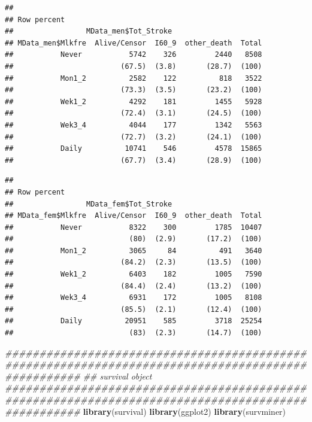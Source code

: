 \documentclass[]{article}
\newenvironment{Shaded}{\begin{snugshade}}{\end{snugshade}}
\newcommand{\CommentTok}[1]{\textcolor[rgb]{0.56,0.35,0.01}{\textit{#1}}}
\newcommand{\DataTypeTok}[1]{\textcolor[rgb]{0.13,0.29,0.53}{#1}}
\newcommand{\KeywordTok}[1]{\textcolor[rgb]{0.13,0.29,0.53}{\textbf{#1}}}
\newcommand{\NormalTok}[1]{#1}
\newcommand{\OperatorTok}[1]{\textcolor[rgb]{0.81,0.36,0.00}{\textbf{#1}}}
\newcommand{\OtherTok}[1]{\textcolor[rgb]{0.56,0.35,0.01}{#1}}
\newcommand{\StringTok}[1]{\textcolor[rgb]{0.31,0.60,0.02}{#1}}
\begin{document}
\begin{verbatim}
## 
## Row percent 
##                 MData_men$Tot_Stroke
## MData_men$Mlkfre  Alive/Censor  I60_9  other_death  Total
##           Never           5742    326         2440   8508
##                         (67.5)  (3.8)       (28.7)  (100)
##           Mon1_2          2582    122          818   3522
##                         (73.3)  (3.5)       (23.2)  (100)
##           Wek1_2          4292    181         1455   5928
##                         (72.4)  (3.1)       (24.5)  (100)
##           Wek3_4          4044    177         1342   5563
##                         (72.7)  (3.2)       (24.1)  (100)
##           Daily          10741    546         4578  15865
##                         (67.7)  (3.4)       (28.9)  (100)
\end{verbatim}

\begin{Shaded}
\end{Shaded}

\begin{verbatim}
## 
## Row percent 
##                 MData_fem$Tot_Stroke
## MData_fem$Mlkfre  Alive/Censor  I60_9  other_death  Total
##           Never           8322    300         1785  10407
##                           (80)  (2.9)       (17.2)  (100)
##           Mon1_2          3065     84          491   3640
##                         (84.2)  (2.3)       (13.5)  (100)
##           Wek1_2          6403    182         1005   7590
##                         (84.4)  (2.4)       (13.2)  (100)
##           Wek3_4          6931    172         1005   8108
##                         (85.5)  (2.1)       (12.4)  (100)
##           Daily          20951    585         3718  25254
##                           (83)  (2.3)       (14.7)  (100)
\end{verbatim}

\begin{Shaded}
\begin{Highlighting}[]
\CommentTok{###################################################################################################}
\CommentTok{## survival object}
\CommentTok{###################################################################################################}
\KeywordTok{library}\NormalTok{(survival)}
\KeywordTok{library}\NormalTok{(ggplot2)}
\KeywordTok{library}\NormalTok{(survminer)}
\end{Highlighting}
\end{Shaded}
\end{document}
